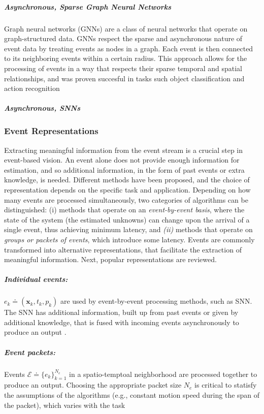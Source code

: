 \documentclass{article}
\begin{document}
\subparagraph{Asynchronous, Sparse Graph Neural Networks} Graph neural networks (GNNs) are a class of neural networks that operate on graph-structured data. GNNs respect the sparse and asynchronous nature of event data by treating events as nodes in a graph. Each event is then connected to its neighboring events within a certain radius. This approach allows for the processing of events in a way that respects their sparse temporal and spatial relationships, and was proven succesful in tasks such object classification and action recognition \cite{biGraphBasedSpatioTemporalFeature2020, dengVoxelGraphCNN2021}

\subparagraph{Asynchronous, SNNs}




\subsubsection{Event Representations}
Extracting meaningful information from the event stream is a crucial step in event-based vision. An event alone does not provide enough information for estimation, and so additional information, in the form of past events or extra knowledge, is needed. Different methods have been proposed, and the choice of representation depends on the specific task and application. Depending on how many events are processed simultaneously, two categories of algorithms can be distinguished: (i) methods that operate on an \textit{event-by-event basis}, where the state of the system (the estimated unknowns) can change upon the arrival of a single event, thus achieving minimum latency, and \textit{(ii)} methods that operate on \textit{groups or packets of events}, which introduce some latency. Events are commonly transformed into alternative representations, that facilitate the extraction of meaningful information. Next, popular representations are reviewed.

\subparagraph{Individual events:} $e_k \doteq (\textbf{x}_k,t_k,p_k)$ are used by event-by-event processing methods, such as SNN. The SNN has additional information, built up from past events or given by additional knowledge, that is fused with incoming events asynchronously to produce an output \cite{paredes-vallesUnsupervisedLearningHierarchical2020,paredes-vallesFullyNeuromorphicVision2023b}.

\subparagraph{Event packets:} Events $\mathcal{E} \doteq \{e_k\}^{N_e}_{k=1}$ in a spatio-temptoal neighborhood are processed together to produce an output. Choosing the appropriate packet size $N_e$ is critical to statisfy the assumptions of the algorithms (e.g., constant motion speed during the span of the packet), which varies with the task \cite{muegglerContinuousTimeVisualInertialOdometry2018, DenseContinuousTimeOptical, bhattacharyaMonocularEventBasedVision2024}
\end{document}
